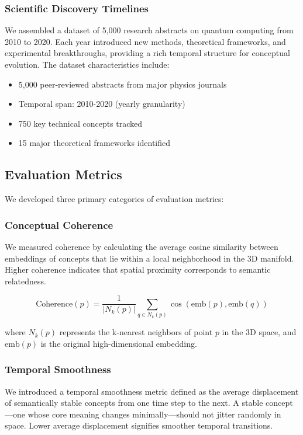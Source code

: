 \documentclass{article}
\begin{document}
\subsubsection{Scientific Discovery Timelines}
We assembled a dataset of 5,000 research abstracts on quantum computing from 2010 to 2020. Each year introduced new methods, theoretical frameworks, and experimental breakthroughs, providing a rich temporal structure for conceptual evolution. The dataset characteristics include:
\begin{itemize}
    \item 5,000 peer-reviewed abstracts from major physics journals
    \item Temporal span: 2010-2020 (yearly granularity)
    \item 750 key technical concepts tracked
    \item 15 major theoretical frameworks identified
\end{itemize}

\subsection{Evaluation Metrics}
We developed three primary categories of evaluation metrics:

\subsubsection{Conceptual Coherence}
We measured coherence by calculating the average cosine similarity between embeddings of concepts that lie within a local neighborhood in the 3D manifold. Higher coherence indicates that spatial proximity corresponds to semantic relatedness.

\begin{equation}
\text{Coherence}(p) = \frac{1}{|N_k(p)|} \sum_{q \in N_k(p)} \cos(\text{emb}(p), \text{emb}(q))
\end{equation}

where $N_k(p)$ represents the k-nearest neighbors of point $p$ in the 3D space, and $\text{emb}(p)$ is the original high-dimensional embedding.

\subsubsection{Temporal Smoothness}
We introduced a temporal smoothness metric defined as the average displacement of semantically stable concepts from one time step to the next. A stable concept—one whose core meaning changes minimally—should not jitter randomly in space. Lower average displacement signifies smoother temporal transitions.
\end{document}
